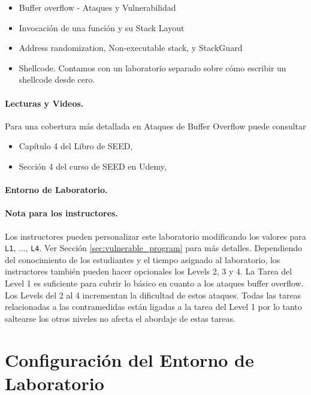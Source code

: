 \begin{itemize}[noitemsep]
\item Buffer overflow - Ataques y Vulnerabilidad
\item Invocación de una función y su Stack Layout
\item Address randomization, Non-executable stack, y StackGuard
\item Shellcode. Contamos con un laboratorio separado sobre cómo escribir un shellcode desde cero.
\end{itemize}



\paragraph{Lecturas y Videos.}
Para una cobertura más detallada en Ataques de Buffer Overflow puede consultar

\begin{itemize}
\item Capítulo 4 del Libro de SEED, \seedbook
\item Sección 4 del curso de SEED en Udemy, \seedcsvideo
\end{itemize}


\paragraph{Entorno de Laboratorio.} \seedenvironmentC


\paragraph{Nota para los instructores.}
Los instructores pueden personalizar este laboratorio modificando los valores para \texttt{L1}, ..., \texttt{L4}. Ver Sección \ref{sec:vulnerable_program} para más detalles.
Dependiendo del conocimiento de los estudiantes y el tiempo asignado al laboratorio, los instructores también pueden hacer opcionales los Levels 2, 3 y 4.
La Tarea del Level 1 es suficiente para cubrir lo básico en cuanto a los ataques buffer overflow. Los Levels del 2 al 4 incrementan la dificultad de estos ataques.
Todas las tareas relacionadas a las contramedidas están ligadas a la tarea del Level 1 por lo tanto saltearse los otros niveles no afecta el abordaje de estas tareas.


\section{Configuración del Entorno de Laboratorio} 

